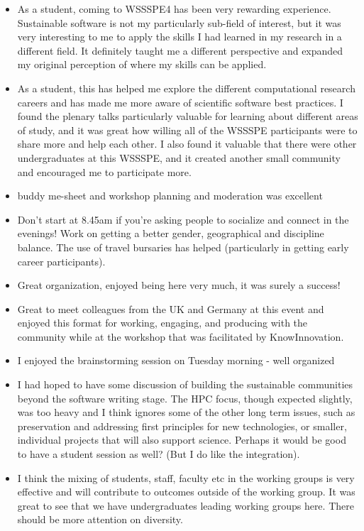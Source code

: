 
\begin{itemize}
\item As a student, coming to WSSSPE4 has been very rewarding experience. Sustainable software is not my particularly sub-field of interest, but it was very interesting to me to apply the skills I had learned in my research in a different field. It definitely taught me a different perspective and expanded my original perception of where my skills can be applied.
\item As a student, this has helped me explore the different computational research careers and has made me more aware of scientific software best practices.  I found the plenary talks particularly valuable for learning about different areas of study, and it was great how willing all of the WSSSPE participants were to share more and help each other. I also found it valuable that there were other undergraduates at this WSSSPE, and it created another small community and encouraged me to participate more.
\item buddy me-sheet and workshop planning and moderation was excellent
\item Don't start at 8.45am if you're asking people to socialize and connect in the evenings! Work on getting a better gender, geographical and discipline balance. The use of travel bursaries has helped (particularly in getting early career participants).
\item Great organization, enjoyed being here very much, it was surely a success!
\item Great to meet colleagues from the UK and Germany at this event and enjoyed this format for working, engaging, and producing with the community while at the workshop that was facilitated by KnowInnovation. 
\item I enjoyed the brainstorming session on Tuesday morning - well organized
\item I had hoped to have some discussion of building the sustainable communities beyond the software writing stage. The HPC focus, though expected slightly, was too heavy and I think ignores some of the other long term issues, such as preservation and addressing first principles for new technologies, or smaller, individual projects that will also support science. Perhaps it would be good to have a student session as well? (But I do like the integration). 
\item I think the mixing of students, staff, faculty etc in the working groups is very effective and will contribute to  outcomes outside of the working group. It was great to see that we have undergraduates leading working groups here. There should be more attention on diversity. 

\end{itemize}
